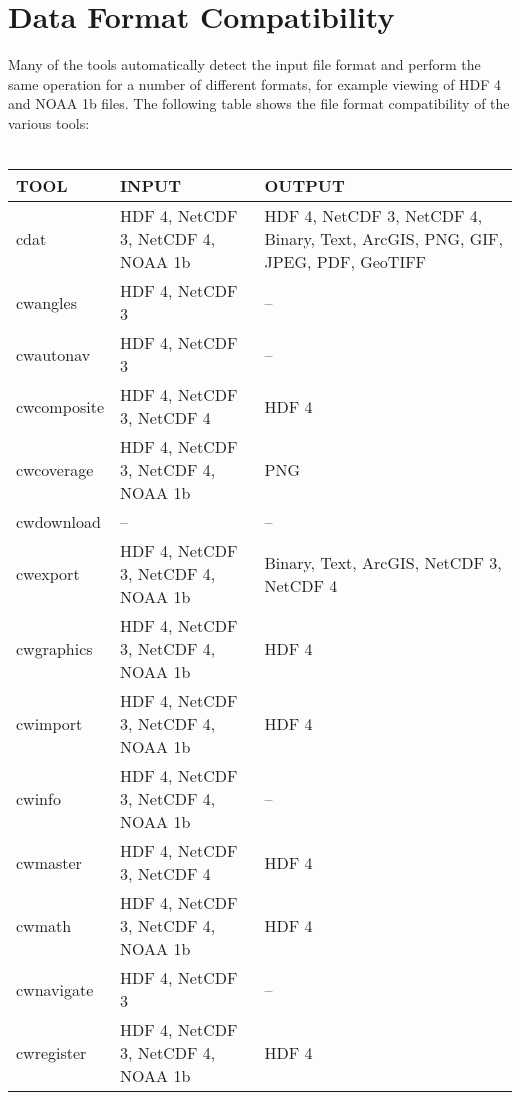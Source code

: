 \chapter{Data Format Compatibility}
\label{compatible}

Many of the tools automatically detect the input file format and
perform the same operation for a number of different formats, for
example viewing of HDF 4 and NOAA 1b files. The following table shows
the file format compatibility of the various tools: \\
\\
\begin{tabular}{|l|p{5cm}|p{5cm}|}
  \hline 

  TOOL & INPUT & OUTPUT \\ \hline

  cdat & HDF 4, NetCDF 3, NetCDF 4, NOAA 1b & HDF 4, NetCDF 3, NetCDF 4,
  Binary, Text, ArcGIS, PNG, GIF, JPEG, PDF, GeoTIFF \\ \hline

  cwangles & HDF 4, NetCDF 3 & -- \\ \hline

  cwautonav & HDF 4, NetCDF 3 & -- \\ \hline

  cwcomposite & HDF 4, NetCDF 3, NetCDF 4 & HDF 4 \\ \hline

  cwcoverage & HDF 4, NetCDF 3, NetCDF 4, NOAA 1b & PNG \\ \hline

  cwdownload & -- & -- \\ \hline

  cwexport & HDF 4, NetCDF 3, NetCDF 4, NOAA 1b & Binary, Text, ArcGIS,
  NetCDF 3, NetCDF 4 \\ \hline

  cwgraphics & HDF 4, NetCDF 3, NetCDF 4, NOAA 1b & HDF 4 \\ \hline

  cwimport & HDF 4, NetCDF 3, NetCDF 4, NOAA 1b & HDF 4 \\ \hline

  cwinfo & HDF 4, NetCDF 3, NetCDF 4, NOAA 1b & -- \\ \hline

  cwmaster & HDF 4, NetCDF 3, NetCDF 4 & HDF 4 \\ \hline

  cwmath & HDF 4, NetCDF 3, NetCDF 4, NOAA 1b & HDF 4 \\ \hline

  cwnavigate & HDF 4, NetCDF 3 & -- \\ \hline

  cwregister & HDF 4, NetCDF 3, NetCDF 4, NOAA 1b & HDF 4 \\ \hline

\end{tabular}

